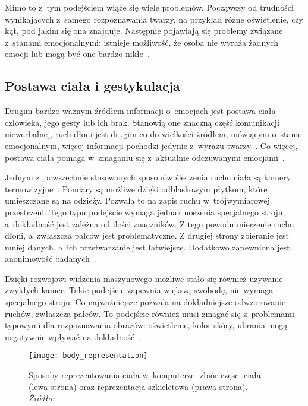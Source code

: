 Mimo to z~tym podejściem wiąże się wiele problemów.
Począwszy od trudności wynikających z~samego rozpoznawania twarzy, na przykład różne oświetlenie, czy kąt, pod jakim się ona znajduje.
Następnie pojawiają się problemy związane z~stanami emocjonalnymi: istnieje możliwość, że osoba nie wyraża żadnych emocji lub mogą być one bardzo nikłe~\cite{Calvo2015}.


\subsection{Postawa ciała i gestykulacja}\label{subsec:postawa-ciaa-i-gestykulacja}

Drugim bardzo ważnym źródłem informacji o~emocjach jest postawa ciała człowieka, jego gesty lub ich brak.
Stanowią one znaczną część komunikacji niewerbalnej, ruch dłoni jest drugim co do wielkości źródłem, mówiącym o~stanie emocjonalnym, więcej informacji pochodzi jedynie z~wyrazu twarzy~\cite{Noroozi2021}.
Co więcej, postawa ciała pomaga w~zmaganiu się z~aktualnie odczuwanymi emocjami~\cite{Kleinsmith2013}.

Jednym z~powszechnie stosowanych sposobów śledzenia ruchu ciała są kamery termowizyjne~\cite{Calvo2015}.
Pomiary są możliwe dzięki odblaskowym płytkom, które umieszczane są na odzieży.
Pozwala to na zapis ruchu w~trójwymiarowej przestrzeni.
Tego typu podejście wymaga jednak noszenia specjalnego stroju, a~dokładność jest zależna od ilości znaczników.
Z tego powodu mierzenie ruchu dłoni, a~zwłaszcza palców jest problematyczne.
Z drugiej strony zbieranie jest mniej danych, a~ich przetwarzanie jest łatwiejsze.
Dodatkowo zapewniona jest anonimowość badanych~\cite{Calvo2015}.

Dzięki rozwojowi widzenia maszynowego możliwe stało się również używanie zwykłych kamer.
Takie podejście zapewnia większą swobodę, nie wymaga specjalnego stroju.
Co najważniejsze pozwala na dokładniejsze odwzorowanie ruchów, zwłaszcza palców.
To podejście również musi zmagać się z~problemami typowymi dla rozpoznawania obrazów: oświetlenie, kolor skóry, ubrania mogą negatywnie wpływać na dokładność~\cite{Calvo2015}.

\begin{figure}[h]
    \centering
    \texttt{[image: body\_representation]}
    \caption{Sposoby reprezentowania ciała w~komputerze: zbiór częsci ciała (lewa strona) oraz reprezentacja szkieletowa (prawa strona). \textit{Źródło:~\cite{Noroozi2021}}}
    \label{fig:body-representation}
\end{figure}

